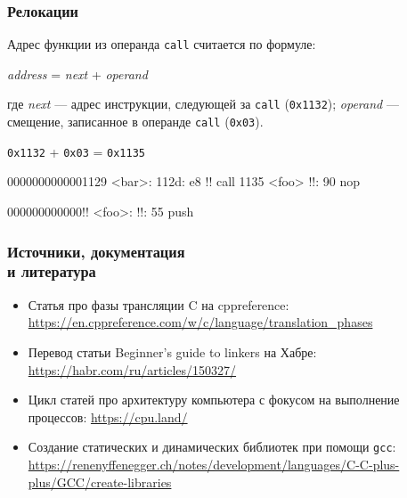 \documentclass[compress, 8pt, aspectratio=169]{beamer}
\begin{document}
\begin{frame}[fragile]

    \frametitle{Релокации}

    Адрес функции из операнда \texttt{call} считается по формуле:

    \begin{center}
    \textit{address} = \textit{next} + \textit{operand}
    \end{center}

    где \textit{next} --- адрес инструкции, следующей за
    \texttt{call} (\texttt{0x1132}); \textit{operand} --- смещение,
    записанное в операнде \texttt{call} (\texttt{0x03}).

    \begin{center}
    \texttt{0x1132} + \texttt{0x03} = \texttt{0x1135}
    \end{center}

    \bigbreak

            \begin{terminalwindow}
0000000000001129 <bar>:
    112d:       e8 !!          call   1135 <foo>
    !!:       90                      nop

000000000000!! <foo>:
    !!:       55                      push   %
            \end{terminalwindow}

\end{frame}


\begin{frame}

    \frametitle{Источники, документация \\ и литература}

    \begin{itemize}

        \item Статья про фазы трансляции C на cppreference:
            \url{https://en.cppreference.com/w/c/language/translation_phases}

        \item Перевод статьи Beginner's guide to linkers на Хабре:
            \url{https://habr.com/ru/articles/150327/}

        \item Цикл статей про архитектуру компьютера с фокусом
            на выполнение процессов: \url{https://cpu.land/}

        \item Создание статических и динамических библиотек
            при помощи \texttt{gcc}:
    \url{https://renenyffenegger.ch/notes/development/languages/C-C-plus-plus/GCC/create-libraries}

    \end{itemize}

\end{frame}
\end{document}
